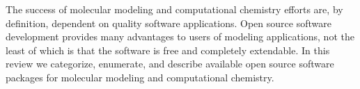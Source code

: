 The success of molecular modeling and computational chemistry efforts are, by definition, dependent on quality software applications. Open source software development provides many advantages to users of modeling applications, not the least of which is that the software is free and completely extendable.  In this review we categorize, enumerate, and describe available open source software packages for molecular modeling and computational chemistry.